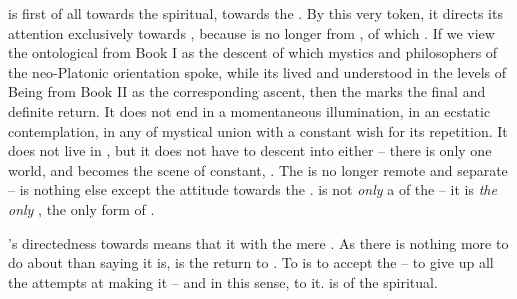  is first of all  towards the {spiritual}, towards
the .
By this very token, it directs its attention
exclusively towards , because  is no longer
 from , of which .  If we
view the ontological  from Book I 
as the descent of which mystics and philosophers of the neo-Platonic orientation
spoke, while its lived and 
understood  in the levels of Being from Book II as the corresponding
ascent, then the  marks the final and definite
return. 
%
It does not end in a momentaneous illumination, in an ecstatic
contemplation, in any  of mystical union with a constant
wish for its repetition.
It does not live in , but it does not have to descent into
 either -- there is only one world, and  becomes
the scene of constant, .
The  is no longer remote and separate -- 
 is nothing else except the attitude towards the .  is not {\em only} a  of the 
-- it is {\em the only} , the only form of .


's directedness towards  means that it  with
the mere . As there is nothing more to do about
 than saying  it is,  is the 
return to . To  is to accept the  --
to give up all the attempts at making it  -- and in this sense, to
 it.
   is  of the spiritual.



